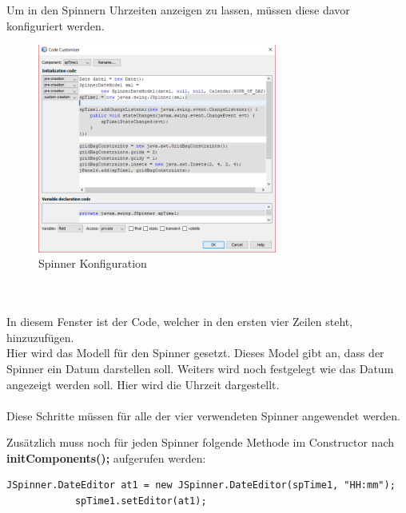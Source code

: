 \newpage

Um in den Spinnern Uhrzeiten anzeigen zu lassen, müssen diese davor konfiguriert werden. 
\begin{figure}
\vspace{-20pt}
  \begin{center}
    \includegraphics[width=0.70\textwidth]{Bilder/Java_Programm/SpinnerConfiguration}
  \end{center}
  \caption{Spinner Konfiguration}
  \label{SpinnerKonfiguration}
  \vspace{0pt}
\end{figure}
\\ \\ In diesem Fenster ist der Code, welcher in den ersten vier Zeilen steht, hinzuzufügen. 
\\ Hier wird das Modell für den Spinner gesetzt. Dieses Model gibt an, dass der Spinner ein Datum darstellen soll. Weiters wird noch festgelegt wie das Datum angezeigt werden soll. Hier wird die Uhrzeit dargestellt. 
\\ \\ Diese Schritte müssen für alle der vier verwendeten Spinner angewendet werden.

\vspace{30pt}

Zusätzlich muss noch für jeden Spinner folgende Methode im Constructor nach \textbf{initComponents();} aufgerufen werden:
\begin{lstlisting}[style=Javastyle, caption=Spinner Zeitzone]
	JSpinner.DateEditor at1 = new JSpinner.DateEditor(spTime1, "HH:mm");
        	spTime1.setEditor(at1);
\end{lstlisting}

\vspace{10pt}

